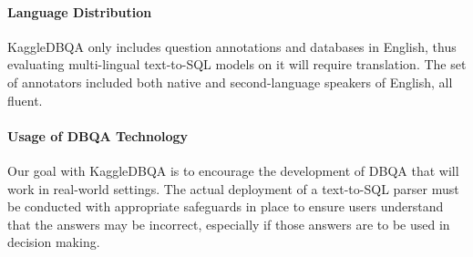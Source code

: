 \documentclass[11pt,a4paper]{article}
\newcommand{\systemname}{\mbox{KaggleDBQA}\xspace}
\begin{document}
\paragraph{Language Distribution}
\systemname only includes question annotations and databases in English, thus evaluating multi-lingual text-to-SQL
models on it will require translation.
The set of annotators included both native and second-language speakers of English, all fluent.

\paragraph{Usage of DBQA Technology}
Our goal with \systemname is to encourage the development of DBQA that will work in real-world settings. The actual deployment of a text-to-SQL parser must be conducted with appropriate safeguards in place to ensure users understand that the answers may be incorrect, especially if those answers are to be used in decision making. 
 







\clearpage
\begin{table*}[t]
    \centering
    \small
    \caption{Evaluation results on \systemname using 100\% of the evaluation data. All numbers are the exact match accuracy evaluated by the Spider official scripts. Here we report the average score of three runs with different random seeds.}
    \label{tab:outofdomain}
\end{table*}
\end{document}
